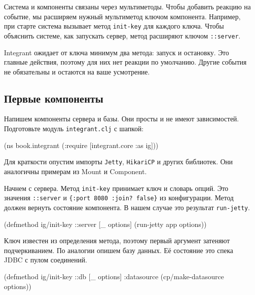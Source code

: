 
Система и компоненты связаны через мультиметоды. Чтобы добавить реакцию на
событие, мы расширяем нужный мультиметод ключом компонента. Например, при старте
система вызывает метод \verb|init-key| для каждого ключа. Чтобы объяснить
системе, как запускать сервер, метод расширяют ключом \verb|::server|.

Integrant ожидает от ключа минимум два метода: запуск и остановку. Это главные
действия, поэтому для них нет реакции по умолчанию. Другие события не
обязательны и остаются на ваше усмотрение.

\subsection{Первые компоненты}


Напишем компоненты сервера и базы. Они просты и не имеют
зависимостей. Подготовьте модуль \verb|integrant.clj| с шапкой:

\begin{english}
  \begin{clojure}
(ns book.integrant
  (:require [integrant.core :as ig]))
  \end{clojure}
\end{english}

Для краткости опустим импорты \verb|Jetty|, \verb|HikariCP| и других
библиотек. Они аналогичны примерам из Mount и Component.

Начнем с сервера. Метод \verb|init-key| принимает ключ и словарь опций. Это
значения \verb|::server| и \verb|{:port 8080 :join? false}| из
конфигурации. Метод должен вернуть состояние компонента. В нашем случае это
результат \verb|run-jetty|.

\begin{english}
  \begin{clojure}
(defmethod ig/init-key ::server
  [_ options]
  (run-jetty app options))
  \end{clojure}
\end{english}


Ключ известен из определения метода, поэтому первый аргумент затеняют
подчеркиванием. По аналогии опишем базу данных. Её состояние это спека JDBC
с пулом соединений.

\begin{english}
  \begin{clojure}
(defmethod ig/init-key ::db
  [_ options]
  {:datasource (cp/make-datasource options)})
  \end{clojure}
\end{english}


